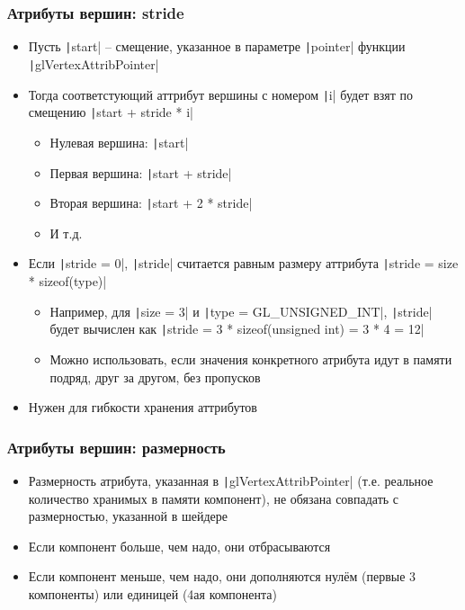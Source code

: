 \documentclass[10pt]{beamer}
\begin{document}
\begin{frame}[fragile]
\frametitle{Атрибуты вершин: stride}
\begin{itemize}
\item Пусть \texttt|start| -- смещение, указанное в параметре \texttt|pointer| функции \texttt|glVertexAttribPointer|
\pause
\item Тогда соответстующий аттрибут вершины с номером \texttt|i| будет взят по смещению \texttt|start + stride * i|
\pause
\begin{itemize}
\item Нулевая вершина: \texttt|start|
\item Первая вершина: \texttt|start + stride|
\item Вторая вершина: \texttt|start + 2 * stride|
\item И т.д.
\end{itemize}
\pause
\item Если \texttt|stride = 0|, \texttt|stride| считается равным размеру аттрибута \texttt|stride = size * sizeof(type)|
\pause
\begin{itemize}
\item Например, для \texttt|size = 3| и \texttt|type = GL_UNSIGNED_INT|, \texttt|stride| будет вычислен как \texttt|stride = 3 * sizeof(unsigned int) = 3 * 4 = 12|
\pause
\item Можно использовать, если значения конкретного атрибута идут в памяти подряд, друг за другом, без пропусков
\end{itemize}
\pause
\item Нужен для гибкости хранения аттрибутов
\end{itemize}
\end{frame}

\begin{frame}[fragile]
\frametitle{Атрибуты вершин: размерность}
\begin{itemize}
\item Размерность атрибута, указанная в \texttt|glVertexAttribPointer| (т.е. реальное количество хранимых в памяти компонент), не обязана совпадать с размерностью, указанной в шейдере
\pause
\item Если компонент больше, чем надо, они отбрасываются
\pause
\item Если компонент меньше, чем надо, они дополняются нулём (первые 3 компоненты) или единицей (4ая компонента)
\end{itemize}
\end{frame}
\end{document}
